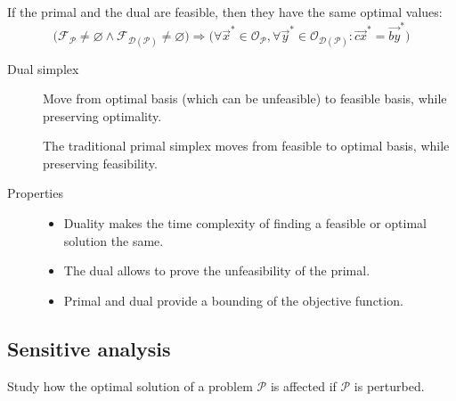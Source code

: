 \begin{theorem} 
    If the primal and the dual are feasible, then they have the same optimal values:
    \[ 
        \Big( \mathcal{F}_{\mathcal{P}} \neq \varnothing \land \mathcal{F}_{\mathcal{D}(\mathcal{P})} \neq \varnothing \Big) \Rightarrow 
        \Big( \forall \vec{x}^* \in \mathcal{O}_\mathcal{P}, \forall \vec{y}^* \in \mathcal{O}_{\mathcal{D}(\mathcal{P})}: \vec{cx}^* = \vec{by}^* \Big)
    \]
\end{theorem}

\begin{description}
    \item[Dual simplex] 
        Move from optimal basis (which can be unfeasible) to feasible basis, while preserving optimality.

        \begin{remark}
            The traditional primal simplex moves from feasible to optimal basis, while preserving feasibility.
        \end{remark}

    \item[Properties]
        \phantom{}
        \begin{itemize}
            \item Duality makes the time complexity of finding a feasible or optimal solution the same.
            \item The dual allows to prove the unfeasibility of the primal.
            \item Primal and dual provide a bounding of the objective function.
        \end{itemize}
\end{description}


\subsection{Sensitive analysis}

Study how the optimal solution of a problem $\mathcal{P}$ is affected if $\mathcal{P}$ is perturbed.

